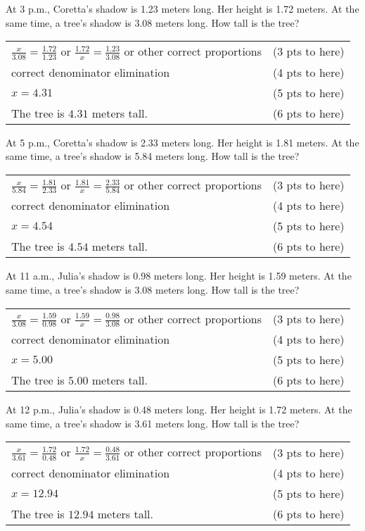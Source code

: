 {
	At 3 p.m., Coretta's shadow is 1.23 meters long. Her height is 1.72 meters. At the same time, a tree's shadow is 3.08 meters long. How tall is the tree?
}
{
	\begin{tabular}{l r}
	$\displaystyle{\frac{x}{3.08}=\frac{1.72}{1.23}}$ or $\displaystyle{\frac{1.72}{x}=\frac{1.23}{3.08}}$ or other correct proportions & (3 pts to here)\\
	correct denominator elimination & (4 pts to here)\\
	$x=4.31$ & (5 pts to here)\\
	The tree is $4.31$ meters tall. & (6 pts to here)
	\end{tabular}
}

{
	At 5 p.m., Coretta's shadow is 2.33 meters long. Her height is 1.81 meters. At the same time, a tree's shadow is 5.84 meters long. How tall is the tree?
}
{
	\begin{tabular}{l r}
	$\displaystyle{\frac{x}{5.84}=\frac{1.81}{2.33}}$ or $\displaystyle{\frac{1.81}{x}=\frac{2.33}{5.84}}$ or other correct proportions & (3 pts to here)\\
	correct denominator elimination & (4 pts to here)\\
	$x=4.54$ & (5 pts to here)\\
	The tree is $4.54$ meters tall. & (6 pts to here)
	\end{tabular}
}

{
	At 11 a.m., Julia's shadow is 0.98 meters long. Her height is 1.59 meters. At the same time, a tree's shadow is 3.08 meters long. How tall is the tree?
}
{
	\begin{tabular}{l r}
	$\displaystyle{\frac{x}{3.08}=\frac{1.59}{0.98}}$ or $\displaystyle{\frac{1.59}{x}=\frac{0.98}{3.08}}$ or other correct proportions & (3 pts to here)\\
	correct denominator elimination & (4 pts to here)\\
	$x=5.00$ & (5 pts to here)\\
	The tree is $5.00$ meters tall. & (6 pts to here)
	\end{tabular}
}

{
	At 12 p.m., Julia's shadow is 0.48 meters long. Her height is 1.72 meters. At the same time, a tree's shadow is 3.61 meters long. How tall is the tree?
}
{
	\begin{tabular}{l r}
	$\displaystyle{\frac{x}{3.61}=\frac{1.72}{0.48}}$ or $\displaystyle{\frac{1.72}{x}=\frac{0.48}{3.61}}$ or other correct proportions & (3 pts to here)\\
	correct denominator elimination & (4 pts to here)\\
	$x=12.94$ & (5 pts to here)\\
	The tree is $12.94$ meters tall. & (6 pts to here)
	\end{tabular}
}
